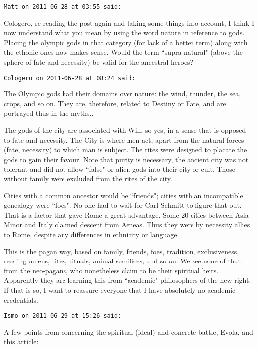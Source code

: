 \begin{footnotesize}
\begin{sffamily}
\hfill

\texttt{Matt on 2011-06-28 at 03:55 said: }

Cologero, re-reading the post again and taking some things into account, I think I now understand what you mean by using the word nature in reference to gods. Placing the olympic gods in that category (for lack of a better term) along with the cthonic ones now makes sense. Would the term ``supra-natural" (above the sphere of fate and necessity) be valid for the ancestral heroes?


\hfill

\texttt{Cologero on 2011-06-28 at 08:24 said: }

The Olympic gods had their domains over nature: the wind, thunder, the sea, crops, and so on. They are, therefore, related to Destiny or Fate, and are portrayed thus in the myths..

The gods of the city are associated with Will, so yes, in a sense that is opposed to fate and necessity. The City is where men act, apart from the natural forces (fate, necessity) to which man is subject. The rites were designed to placate the gods to gain their favour. Note that purity is necessary, the ancient city was not tolerant and did not allow ``false" or alien gods into their city or cult. Those without family were excluded from the rites of the city.

Cities with a common ancestor would be ``friends"; cities with an incompatible genealogy were ``foes". No one had to wait for Carl Schmitt to figure that out. That is a factor that gave Rome a great advantage. Some 20 cities between Asia Minor and Italy claimed descent from Aeneas. Thus they were by necessity allies to Rome, despite any differences in ethnicity or language.

This is the pagan way, based on family, friends, foes, tradition, exclusiveness, reading omens, rites, rituals, animal sacrifices, and so on. We see none of that from the neo-pagans, who nonetheless claim to be their spiritual heirs. Apparently they are learning this from ``academic" philosophers of the new right. If that is so, I want to reassure everyone that I have absolutely no academic credentials.


\hfill

\texttt{Ismo on 2011-06-29 at 15:26 said: }

A few points from concerning the spiritual (ideal) and concrete battle, Evola, and this article:


\end{sffamily}
\end{footnotesize}
